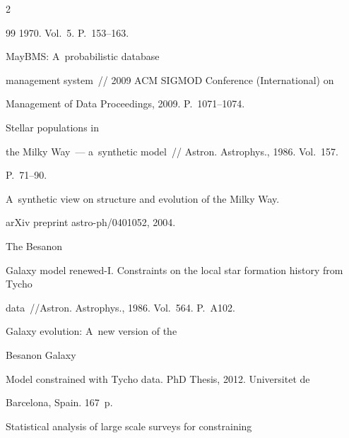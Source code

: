 \begin{multicols}{2}
{{\begin{thebibliography}{99}
1970.  Vol.~5. P.~153--163.




 MayBMS: A~probabilistic database


management system~// 2009 ACM SIGMOD Conference (International) on


Management of Data Proceedings, 2009. P.~1071--1074.







 Stellar populations in


the Milky Way~--- a~synthetic model~// Astron. Astrophys., 1986. Vol.~157.


P.~71--90.







 A~synthetic view on structure and evolution of the Milky Way.


arXiv preprint astro-ph/0401052, 2004.









The Besan{\!\fontsize{10pt}{10pt}\selectfont{}}on


Galaxy model renewed-I. Constraints on the local star formation history from Tycho


data~//Astron. Astrophys., 1986. Vol.~564. P.~A102.







 Galaxy evolution: A~new version of the


Besan{\!\fontsize{10pt}{10pt}\selectfont{}}on Galaxy


Model constrained with Tycho data. PhD Thesis, 2012. Universitet de


Barcelona, Spain. 167~p.




 Statistical analysis  of large scale surveys for constraining



\end{thebibliography}}}
\end{multicols}
